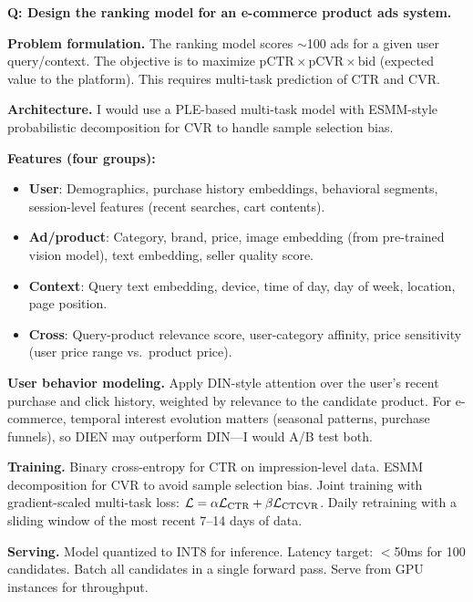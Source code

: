 \begin{interviewq}
\textbf{Q: Design the ranking model for an e-commerce product ads system.}

 \quad {} \quad \badgefreq{\freqhigh}

\stronganswer

\textbf{Problem formulation.} The ranking model scores $\sim$100 ads for a given user query/context. The objective is to maximize $\text{pCTR} \times \text{pCVR} \times \text{bid}$ (expected value to the platform). This requires multi-task prediction of CTR and CVR.

\textbf{Architecture.} I would use a PLE-based multi-task model with ESMM-style probabilistic decomposition for CVR to handle sample selection bias.

\textbf{Features (four groups):}
\begin{itemize}
    \item \textbf{User}: Demographics, purchase history embeddings, behavioral segments, session-level features (recent searches, cart contents).
    \item \textbf{Ad/product}: Category, brand, price, image embedding (from pre-trained vision model), text embedding, seller quality score.
    \item \textbf{Context}: Query text embedding, device, time of day, day of week, location, page position.
    \item \textbf{Cross}: Query-product relevance score, user-category affinity, price sensitivity (user price range vs.\ product price).
\end{itemize}

\textbf{User behavior modeling.} Apply DIN-style attention over the user's recent purchase and click history, weighted by relevance to the candidate product. For e-commerce, temporal interest evolution matters (seasonal patterns, purchase funnels), so DIEN may outperform DIN---I would A/B test both.

\textbf{Training.} Binary cross-entropy for CTR on impression-level data. ESMM decomposition for CVR to avoid sample selection bias. Joint training with gradient-scaled multi-task loss: $\mathcal{L} = \alpha \mathcal{L}_{\text{CTR}} + \beta \mathcal{L}_{\text{CTCVR}}$. Daily retraining with a sliding window of the most recent 7--14 days of data.

\textbf{Serving.} Model quantized to INT8 for inference. Latency target: $<$50ms for 100 candidates. Batch all candidates in a single forward pass. Serve from GPU instances for throughput.


\end{interviewq}
